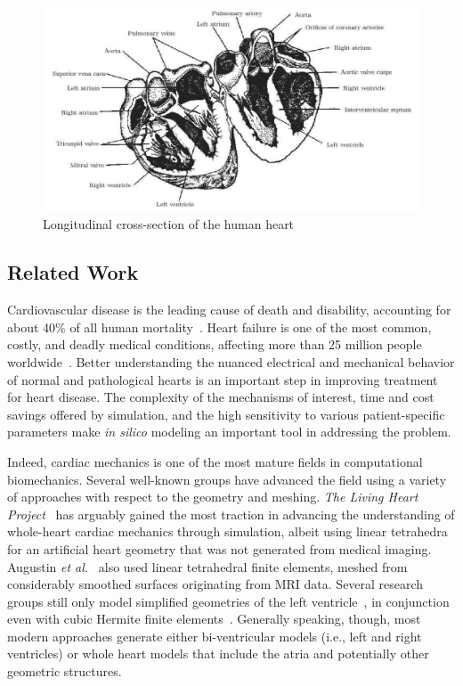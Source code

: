 \begin{figure}[htbp!]
\centering
\includegraphics[width=1.0\textwidth]{media/anatomy.png}
\caption{Longitudinal cross-section of the human heart~\cite{katz_2015}}
\label{fig:anatomy}
\end{figure}

\subsection{Related Work}
Cardiovascular disease is the leading cause of death and disability, accounting for about 40$\%$ of all human mortality~\cite{genet_2015}. Heart failure is one of the most common, costly, and deadly medical conditions, affecting more than 25 million people worldwide~\cite{mann_2015}. Better understanding the nuanced electrical and mechanical behavior of normal and pathological hearts is an important step in improving treatment for heart disease. The complexity of the mechanisms of interest, time and cost savings offered by simulation, and the high sensitivity to various patient-specific parameters make \textit{in silico} modeling an important tool in addressing the problem.

Indeed, cardiac mechanics is one of the most mature fields in computational biomechanics. Several well-known groups have advanced the field using a variety of approaches with respect to the geometry and meshing. \textit{The Living Heart Project}~\cite{genet_2015, baillargeon_2014} has arguably gained the most traction in advancing the understanding of whole-heart cardiac mechanics through simulation, albeit using linear tetrahedra for an artificial heart geometry that was not generated from medical imaging. Augustin \textit{et al.}~\cite{augustin_2016} also used linear tetrahedral finite elements, meshed from considerably smoothed surfaces originating from MRI data. Several research groups still only model simplified geometries of the left ventricle~\cite{guccione_2005, sack_2016}, in conjunction even with cubic Hermite finite elements~\cite{mcculloch_2000}. Generally speaking, though, most modern approaches generate either bi-ventricular models (i.e., left and right ventricles) or whole heart models that include the atria and potentially other geometric structures.

